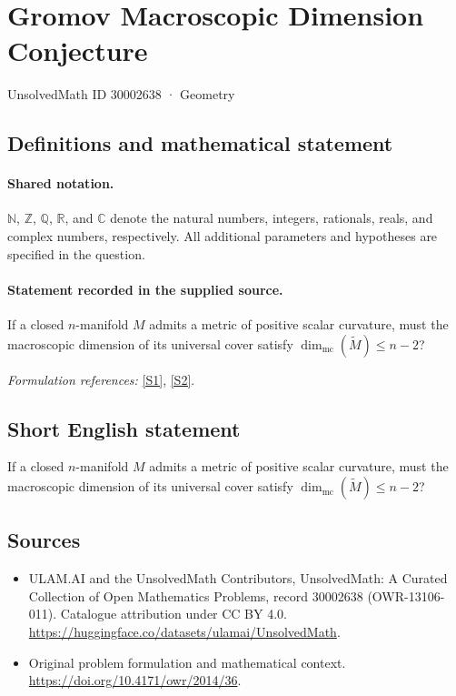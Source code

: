 \documentclass[11pt]{article}
\newcommand{\sref}[2]{\hyperlink{source:#1:#2}{[S#2]}}
\begin{document}
\setcounter{section}{30002637}
\section{Gromov Macroscopic Dimension Conjecture}\label{30002638}
{\small UnsolvedMath ID 30002638 · Geometry}
\subsection{Definitions and mathematical statement}

\paragraph{Shared notation.}$\mathbb N$, $\mathbb Z$, $\mathbb Q$, $\mathbb R$, and $\mathbb C$ denote the natural numbers, integers, rationals, reals, and complex numbers, respectively. All additional parameters and hypotheses are specified in the question.


\paragraph{Statement recorded in the supplied source.}
If a closed $n$-manifold $M$ admits a metric of positive scalar curvature, must the macroscopic dimension of its universal cover satisfy $\dim_{\mathrm{mc}}(\widetilde M)\leq n-2$?
\par\smallskip\textit{Formulation references:} \sref{30002638}{1}, \sref{30002638}{2}.
\subsection{Short English statement}
If a closed $n$-manifold $M$ admits a metric of positive scalar curvature, must the macroscopic dimension of its universal cover satisfy $\dim_{\mathrm{mc}}(\widetilde M)\leq n-2$?
\subsection{Sources}
\begin{itemize}
\item[\hypertarget{source:30002638:1}{S1}] ULAM.AI and the UnsolvedMath Contributors, UnsolvedMath: A Curated Collection of Open Mathematics Problems, record 30002638 (OWR-13106-011). Catalogue attribution under CC BY 4.0.
\url{https://huggingface.co/datasets/ulamai/UnsolvedMath}.
\item[\hypertarget{source:30002638:2}{S2}] Original problem formulation and mathematical context.
\url{https://doi.org/10.4171/owr/2014/36}.
\end{itemize}
\label{end:30002638}
\end{document}
